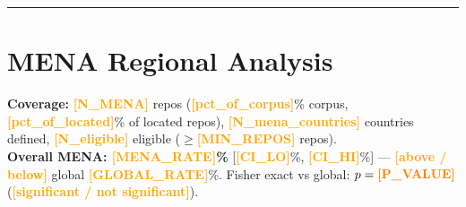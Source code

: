 \documentclass[10pt,a4paper]{article}
\newcommand{\FILLIN}[1]{\textcolor{orange}{\textbf{[#1]}}}
\begin{document}

\vspace{6pt}
\hrule
\vspace{6pt}

\section*{MENA Regional Analysis}

\textbf{Coverage:} \FILLIN{N\_MENA} repos (\FILLIN{pct\_of\_corpus}\% corpus, \FILLIN{pct\_of\_located}\% of located repos),
\FILLIN{N\_mena\_countries} countries defined, \FILLIN{N\_eligible} eligible ($\geq$\FILLIN{MIN\_REPOS} repos).\\
\textbf{Overall MENA: \FILLIN{MENA\_RATE}\%} [\FILLIN{CI\_LO}\%, \FILLIN{CI\_HI}\%] ---
\FILLIN{above / below} global \FILLIN{GLOBAL\_RATE}\%.
Fisher exact vs global: $p = \FILLIN{P\_VALUE}$ (\FILLIN{significant / not significant}).
\end{document}
